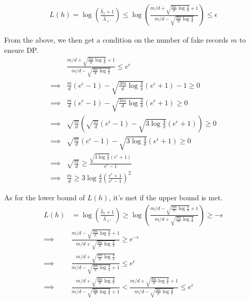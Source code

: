 \documentclass[11pt]{article}
\begin{document}
 \begin{align}
 L(h) =  \log  \left ( \frac{\hat{h}_\ell + 1}{\hat{h}_{\ell'}} \right ) \le \log  \left ( \frac{ m/d + \sqrt{  \frac{3m}{d} \log{\frac{4}{\delta}}} + 1}{  m/d - \sqrt{  \frac{3m}{d} \log{\frac{4}{\delta}}} } \right ) \le \epsilon 
\end{align}

From the above, we then get a condition on the number of fake records $m$ to ensure DP.
 \begin{align}
& \frac{ m/d + \sqrt{  \frac{3m}{d} \log{\frac{4}{\delta}}} + 1}{  m/d - \sqrt{  \frac{3m}{d} \log{\frac{4}{\delta}}}} \le e^\epsilon  \\
\implies & \frac{m}{d} (e^\epsilon - 1) -  \sqrt{  \frac{3m}{d} \log{\frac{4}{\delta}}} (e^\epsilon +1) - 1 \ge 0 \\
\implies & \frac{m}{d} (e^\epsilon - 1) -  \sqrt{  \frac{3m}{d} \log{\frac{4}{\delta}}} (e^\epsilon +1) \ge 0 \\
\implies &\sqrt{  \frac{m}{d}} \left ( \sqrt{  \frac{m}{d}} (e^\epsilon - 1)  - \sqrt{  3 \log{\frac{4}{\delta}}} (e^\epsilon +1) \right ) \ge 0 \\
\implies &\sqrt{  \frac{m}{d}} (e^\epsilon - 1)  - \sqrt{  3 \log{\frac{4}{\delta}}} (e^\epsilon +1)  \ge 0 \\
\implies &\sqrt{  \frac{m}{d}}  \ge  \frac { \sqrt{  3 \log{\frac{4}{\delta}}} (e^\epsilon +1)  } { e^\epsilon - 1 } \\
\implies & \frac{m}{d} \ge 3\log {\frac{4}{\delta}} \left ( \frac{e^\epsilon +1}{e^\epsilon - 1} \right )^2  \label{eq:cfake}
\end{align}

As for the lower bound of $L(h)$, it's met if the upper bound is met.
 \begin{align*}
 L(h) & =  \log  \left ( \frac{\hat{h}_\ell + 1}{\hat{h}_{\ell'}} \right ) \ge \log  \left ( \frac{ m/d - \sqrt{  \frac{3m}{d} \log{\frac{4}{\delta}}} + 1}{  m/d + \sqrt{  \frac{3m}{d} \log{\frac{4}{\delta}}} } \right ) \ge - \epsilon  \\
\implies &  \frac{ m/d - \sqrt{  \frac{3m}{d} \log{\frac{4}{\delta}}} + 1}{  m/d + \sqrt{  \frac{3m}{d} \log{\frac{4}{\delta}}}} \ge e^{-\epsilon} \\
 \implies &  \frac{  m/d + \sqrt{  \frac{3m}{d} \log{\frac{4}{\delta}}}}  { m/d - \sqrt{  \frac{3m}{d} \log{\frac{4}{\delta}}} + 1} \le e^{\epsilon}  \\
\implies &   \frac{  m/d + \sqrt{  \frac{3m}{d} \log{\frac{4}{\delta}}}}  { m/d - \sqrt{  \frac{3m}{d} \log{\frac{4}{\delta}}} + 1} < \frac{ m/d + \sqrt{  \frac{3m}{d} \log{\frac{4}{\delta}}} + 1}{  m/d - \sqrt{  \frac{3m}{d} \log{\frac{4}{\delta}}}} \le e^{\epsilon} 
\end{align*}
\end{document}
